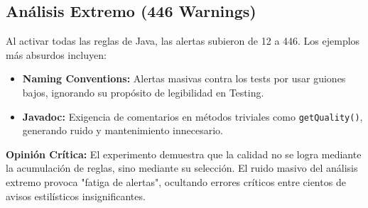 \documentclass[12pt,a4paper]{article}
\begin{document}
\subsection*{Análisis Extremo (446 Warnings)}
Al activar todas las reglas de Java, las alertas subieron de 12 a 446. Los ejemplos más absurdos incluyen:
\begin{itemize}
    \item \textbf{Naming Conventions:} Alertas masivas contra los tests por usar guiones bajos, ignorando su propósito de legibilidad en Testing.
    \item \textbf{Javadoc:} Exigencia de comentarios en métodos triviales como \texttt{getQuality()}, generando ruido y mantenimiento innecesario.
\end{itemize}

\textbf{Opinión Crítica:} El experimento demuestra que la calidad no se logra mediante la acumulación de reglas, sino mediante su selección. El ruido masivo del análisis extremo provoca "fatiga de alertas", ocultando errores críticos entre cientos de avisos estilísticos insignificantes.
\end{document}
